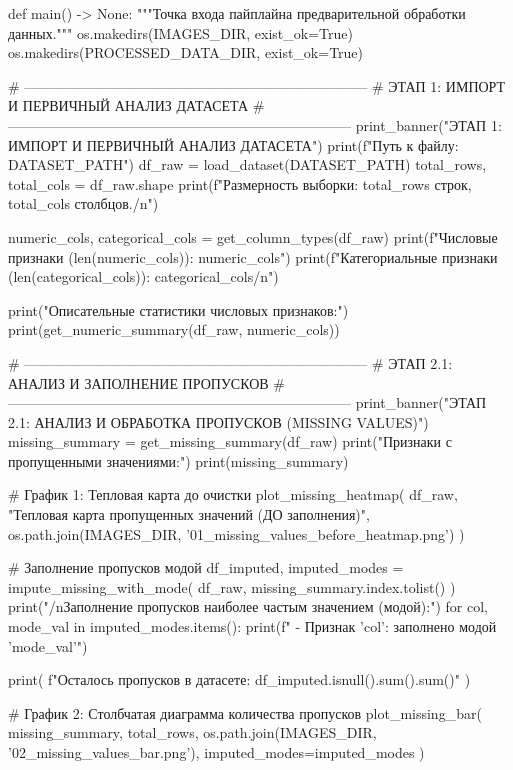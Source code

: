 \documentclass[14pt,a4paper]{extarticle}
\begin{document}
\begin{CodeListing}
def main() -> None:
    """Точка входа пайплайна предварительной обработки данных."""
    os.makedirs(IMAGES_DIR, exist_ok=True)
    os.makedirs(PROCESSED_DATA_DIR, exist_ok=True)

    # --------------------------------------------------------------------------
    # ЭТАП 1: ИМПОРТ И ПЕРВИЧНЫЙ АНАЛИЗ ДАТАСЕТА
    # --------------------------------------------------------------------------
    print_banner("ЭТАП 1: ИМПОРТ И ПЕРВИЧНЫЙ АНАЛИЗ ДАТАСЕТА")
    print(f"Путь к файлу: {DATASET_PATH}")
    df_raw = load_dataset(DATASET_PATH)
    total_rows, total_cols = df_raw.shape
    print(f"Размерность выборки: {total_rows} строк, {total_cols} столбцов./n")

    numeric_cols, categorical_cols = get_column_types(df_raw)
    print(f"Числовые признаки ({len(numeric_cols)}): {numeric_cols}")
    print(f"Категориальные признаки ({len(categorical_cols)}): {categorical_cols}/n")

    print("Описательные статистики числовых признаков:")
    print(get_numeric_summary(df_raw, numeric_cols))

    # --------------------------------------------------------------------------
    # ЭТАП 2.1: АНАЛИЗ И ЗАПОЛНЕНИЕ ПРОПУСКОВ
    # --------------------------------------------------------------------------
    print_banner("ЭТАП 2.1: АНАЛИЗ И ОБРАБОТКА ПРОПУСКОВ (MISSING VALUES)")
    missing_summary = get_missing_summary(df_raw)
    print("Признаки с пропущенными значениями:")
    print(missing_summary)

    # График 1: Тепловая карта до очистки
    plot_missing_heatmap(
        df_raw,
        "Тепловая карта пропущенных значений (ДО заполнения)",
        os.path.join(IMAGES_DIR, '01_missing_values_before_heatmap.png')
    )

    # Заполнение пропусков модой
    df_imputed, imputed_modes = impute_missing_with_mode(
        df_raw, missing_summary.index.tolist()
    )
    print("/nЗаполнение пропусков наиболее частым значением (модой):")
    for col, mode_val in imputed_modes.items():
        print(f"  - Признак '{col}': заполнено модой '{mode_val}'")

    print(
        f"Осталось пропусков в датасете: {df_imputed.isnull().sum().sum()}"
    )

    # График 2: Столбчатая диаграмма количества пропусков
    plot_missing_bar(
        missing_summary,
        total_rows,
        os.path.join(IMAGES_DIR, '02_missing_values_bar.png'),
        imputed_modes=imputed_modes
    )


\end{CodeListing}
\end{document}
